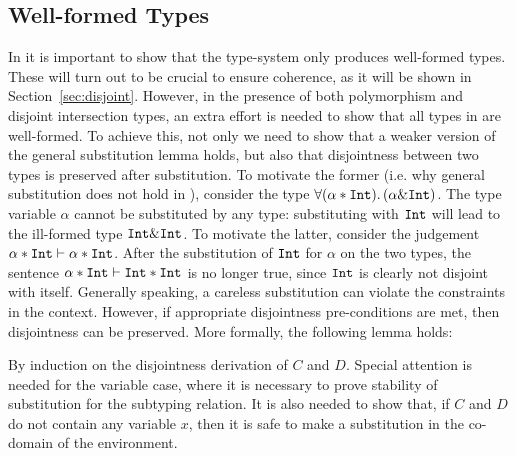 \subsection{Well-formed Types}
In \name it is important to show that the type-system only produces well-formed types.
These will turn out to be crucial to ensure coherence, as it will be shown in Section~\ref{sec:disjoint}.
However, in the presence of both polymorphism and disjoint intersection types, an extra
effort is needed to show that all types in \name are well-formed.
To achieve this, not only we need to show that a weaker version of the general substitution lemma holds, 
but also that disjointness between two types is preserved after substitution.
To motivate the former (i.e. why general substitution does not hold in \name), 
consider the type $\forall (\alpha * \texttt{Int}).\, (\alpha \& \texttt{Int})$. 
The type variable $\alpha$ cannot be substituted by any type: substituting with $\texttt{Int}$ will lead to the
ill-formed type $\texttt{Int} \& \texttt{Int}$.
To motivate the latter, consider the judgement $ \alpha * \texttt{Int} \vdash \alpha * \texttt{Int}$.
After the substitution of $\texttt{Int}$ for $\alpha$ on the two types, the sentence
$\alpha * \texttt{Int} \vdash \texttt{Int} * \texttt{Int}$ is no longer true, since $\texttt{Int}$ is
clearly not disjoint with itself.
Generally speaking, a careless substitution can violate the constraints in the context.
However, if appropriate disjointness pre-conditions are met, then disjointness can
be preserved.
More formally, the following lemma holds: 

{By induction on the disjointness derivation of $C$ and $D$.
  Special attention is needed for the variable case, where it is necessary to prove stability
  of substitution for the subtyping relation.
  It is also needed to show that, if $C$ and $D$ do not contain any variable $x$, then it is
  safe to make a substitution in the co-domain of the environment.}

